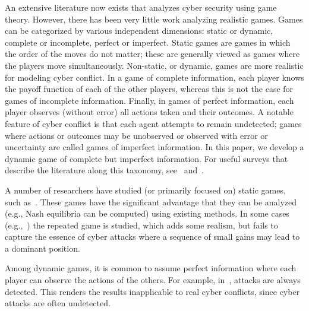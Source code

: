 An extensive literature now exists that analyzes cyber security using
game theory. However, there has been very little work analyzing realistic
games. Games can be categorized by various independent dimensions:
static or dynamic, complete or incomplete, perfect
or imperfect. Static games are games in which the order of the moves
do not matter; these are generally viewed as games where the players
move simultaneously. Non-static, or dynamic, games are more realistic
for modeling cyber conflict. In a game of complete information, each
player knows the payoff function of each of the other players, whereas
this is not the case for games of incomplete information. Finally, in
games of perfect information, each player observes (without error) all
actions taken and their outcomes. A notable feature of cyber conflict
is that each agent attempts to remain undetected; games where actions
or outcomes may be unobserved or observed with error or uncertainty
are called games of imperfect information. In this paper, we develop a
dynamic game of complete but imperfect information. For useful surveys
that describe the literature along this taxonomy,
see~\cite{liang2013game} and~\cite{roy2010survey}.


A number of researchers have studied (or primarily focused on) static
games, such as~\cite{chen2009game,grossklags2009uncertainty,he2012game,liu2006bayesian}. These
games have the significant advantage that they can be analyzed (e.g.,
Nash equilibria can be computed) using existing methods. In some cases
(e.g.,~\cite{nguyen2009security}) the repeated game is studied, which
adds some realism, but fails to capture the essence of cyber attacks
where a sequence of small gains may lead to a dominant position.


Among dynamic games, it is common to assume perfect information where
each player can observe the actions of the others. For example,
in~\cite{luo2010game, nguyen2009security, patcha2004game, 
  sagduyu2011jamming, shamma2005dynamic}, attacks are always
detected. This renders the results inapplicable to real cyber
conflicts, since cyber attacks are often undetected.


